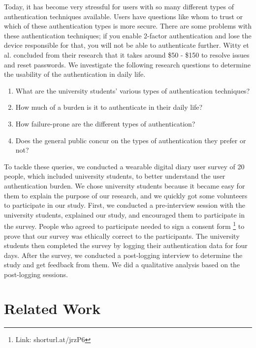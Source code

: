 Today, it has become very stressful for users with so many different types of authentication techniques available.  Users have questions like whom to trust or which of these authentication types is more secure. There are some problems with these authentication techniques; if you enable 2-factor authentication and lose the device responsible for that, you will not be able to authenticate further. Witty et al. \cite{} concluded from their research that it takes around \$50 - \$150 to resolve issues and reset passwords. We investigate the following research questions to determine the usability of the authentication in daily life. 
\begin{enumerate}
    \item What are the university students' various types of authentication techniques?
    \item How much of a burden is it to authenticate in their daily life?
    \item How failure-prone are the different types of authentication? 
    \item Does the general public concur on the types of authentication they prefer or not?
\end{enumerate}

To tackle these queries, we conducted a wearable digital diary user survey of 20 people, which included university students, to better understand the user authentication burden. We chose university students because it became easy for them to explain the purpose of our research, and we quickly got some volunteers to participate in our study. First, we conducted a pre-interview session with the university students, explained our study, and encouraged them to participate in the survey. People who agreed to participate needed to sign a consent form%
\footnote{Link: shorturl.at/jrzP6} to prove that our survey was ethically correct to the participants. The university students then completed the survey by logging their authentication data for four days. After the survey, we conducted a post-logging interview to determine the study and get feedback from them. We did a qualitative analysis based on the post-logging sessions. 

\section{Related Work}

